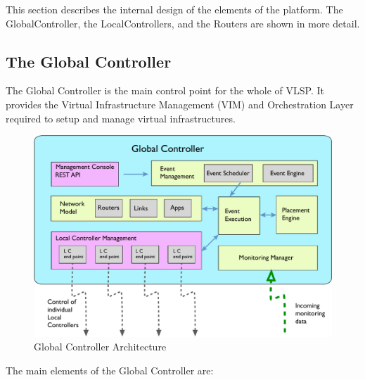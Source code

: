 This section describes the internal design of the elements of the
platform.
The GlobalController, the LocalControllers, and the Routers are shown
in more detail.

\subsection{The Global Controller}

The Global Controller is the main control point for the whole of VLSP.
It provides the Virtual Infrastructure Management (VIM) and
Orchestration Layer required to setup and manage virtual infrastructures.

\begin{figure}[h!]
    \centering
    \includegraphics[width=14.5cm]{images/global_controller}
    \caption{Global Controller Architecture}
    \label{global-controller}
\end{figure}

The main elements of the Global Controller are:

